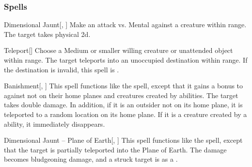 \subsubsection{Spells}


\lowercase{\hypertarget{spell:Dimensional Jaunt}{}}\label{spell:Dimensional Jaunt}
\begin{apability}[\nth{1}]{\hypertarget{spell:Dimensional Jaunt}{Dimensional Jaunt}}[, ]
Make an attack vs. Mental against a creature within \rngmed range.
\hit The target takes physical  \plus2d.
\end{apability}
\vspace{0.25em}



\lowercase{\hypertarget{spell:Teleport}{}}\label{spell:Teleport}
\begin{apability}[\nth{1}]{\hypertarget{spell:Teleport}{Teleport}}[]
Choose a Medium or smaller willing creature or unattended object within \rngclose range.
The target teleports into an unoccupied destination within range.
If the destination is invalid, this spell is .
\end{apability}
\vspace{0.25em}



\lowercase{\hypertarget{spell:Banishment}{}}\label{spell:Banishment}
\begin{apability}[\nth{2}]{\hypertarget{spell:Banishment}{Banishment}}[, ]
This spell functions like the  spell, except that it gains a  bonus to  against  not on their home planes and creatures created by  abilities.
\crit The target takes double damage.
In addition, if it is an outsider not on its home plane, it is teleported to a random location on its home plane.
If it is a creature created by a  ability, it immediately disappears.
\end{apability}
\vspace{0.25em}



\lowercase{\hypertarget{spell:Dimensional Jaunt -- Plane of Earth}{}}\label{spell:Dimensional Jaunt -- Plane of Earth}
\begin{apability}[\nth{2}]{\hypertarget{spell:Dimensional Jaunt -- Plane of Earth}{Dimensional Jaunt -- Plane of Earth}}[, ]
This spell functions like the  spell, except that the target is partially teleported into the Plane of Earth.
The damage becomes bludgeoning damage, and a struck target is  as a .
\end{apability}
\vspace{0.25em}



